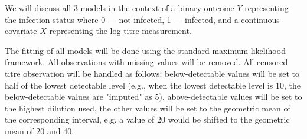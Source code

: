 We will discuss all 3 models in the context of a binary outcome $Y$ representing the infection status where 0 --- not infected, 1 --- infected, and a continuous covariate $X$ representing the log-titre measurement. 

The fitting of all models will be done using the standard maximum likelihood framework. All observations with missing values will be removed. All censored titre observation will be handled as follows: below-detectable values will be set to half of the lowest detectable level (e.g., when the lowest detectable level is 10, the below-detectable values are "imputed" as 5), above-detectable values will be set to the highest dilution used, the other values will be set to the geometric mean of the corresponding interval, e.g. a value of 20 would be shifted to the geometric mean of 20 and 40.
